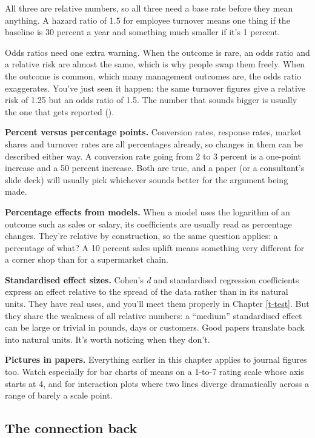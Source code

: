 \documentclass[
]{book}
\begin{document}
All three are relative numbers, so all three need a base rate before they mean anything. A hazard ratio of 1.5 for employee turnover means one thing if the baseline is 30 percent a year and something much smaller if it's 1 percent.

Odds ratios need one extra warning. When the outcome is rare, an odds ratio and a relative risk are almost the same, which is why people swap them freely. When the outcome is common, which many management outcomes are, the odds ratio exaggerates. You've just seen it happen: the same turnover figures give a relative risk of 1.25 but an odds ratio of 1.5. The number that sounds bigger is usually the one that gets reported ().

\textbf{Percent versus percentage points.} Conversion rates, response rates, market shares and turnover rates are all percentages already, so changes in them can be described either way. A conversion rate going from 2 to 3 percent is a one-point increase and a 50 percent increase. Both are true, and a paper (or a consultant's slide deck) will usually pick whichever sounds better for the argument being made.

\textbf{Percentage effects from models.} When a model uses the logarithm of an outcome such as sales or salary, its coefficients are usually read as percentage changes. They're relative by construction, so the same question applies: a percentage of what? A 10 percent sales uplift means something very different for a corner shop than for a supermarket chain.

\textbf{Standardised effect sizes.} Cohen's \emph{d} and standardised regression coefficients express an effect relative to the spread of the data rather than in its natural units. They have real uses, and you'll meet them properly in Chapter \ref{t-test}. But they share the weakness of all relative numbers: a ``medium'' standardised effect can be large or trivial in pounds, days or customers. Good papers translate back into natural units. It's worth noticing when they don't.

\textbf{Pictures in papers.} Everything earlier in this chapter applies to journal figures too. Watch especially for bar charts of means on a 1-to-7 rating scale whose axis starts at 4, and for interaction plots where two lines diverge dramatically across a range of barely a scale point.

\subsection{The connection back}\label{the-connection-back}
\end{document}
